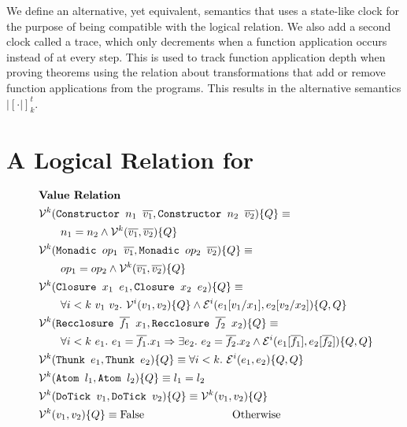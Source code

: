 We define an alternative, yet equivalent, semantics that uses a state-like clock
for the purpose of being compatible with the logical relation. We also add a
second clock called a trace, which only decrements when a function application
occurs instead of at every step. This is used to track function application
depth when proving theorems using the relation about transformations that add or
remove function applications from the programs. This results in the alternative
semantics $|[\cdot|]_k^t$.

\section{A Logical Relation for \ThunkLang{}}

\begin{figure}[p]
\begin{align*}
  &\textbf{Value Relation}\\
  &\mathcal{V}^k(\lit{Constructor $n_1$ $\overline{v_1}$}, \lit{Constructor $n_2$ $\overline{v_2}$})\{Q\} \equiv\\
  &\qquad n_1 = n_2 \land \mathcal{V}^k(\overline{v_1}, \overline{v_2})\{Q\}\\
  &\mathcal{V}^k(\lit{Monadic $op_1$ $\overline{v_1}$}, \lit{Monadic $op_2$ $\overline{v_2}$})\{Q\} \equiv\\
  &\qquad op_1 = op_2 \land \mathcal{V}^k(\overline{v_1}, \overline{v_2})\{Q\}\\
  &\mathcal{V}^k(\lit{Closure $x_1$ $e_1$}, \lit{Closure $x_2$ $e_2$})\{Q\} \equiv\\
  &\qquad \forall i < k\ v_1\ v_2.\ \mathcal{V}^i(v_1, v_2)\{Q\} \land \mathcal{E}^i(e_1[v_1/x_1], e_2[v_2/x_2])\{Q,Q\}\\
  &\mathcal{V}^k(\lit{Recclosure $\overline{f_1}$ $x_1$}, \lit{Recclosure $\overline{f_2}$ $x_2$})\{Q\} \equiv\\
  &\qquad \forall i < k\ e_1.\ e_1 = \overline{f_1}.x_1
  \Rightarrow \exists e_2.\ e_2 = \overline{f_2}.x_2
  \land \mathcal{E}^i(e_1[\overline{f_1}], e_2[\overline{f_2}])\{Q,Q\}\\
  &\mathcal{V}^k(\lit{Thunk $e_1$}, \lit{Thunk $e_2$})\{Q\} \equiv
  \forall i < k.\ \mathcal{E}^i(e_1, e_2)\{Q,Q\}\\
  &\mathcal{V}^k(\lit{Atom $l_1$}, \lit{Atom $l_2$})\{Q\} \equiv
  l_1 = l_2\\
  &\mathcal{V}^k(\lit{DoTick $v_1$}, \lit{DoTick $v_2$})\{Q\} \equiv
  \mathcal{V}^k(v_1, v_2)\{Q\}\\
  &\mathcal{V}^k(v_1, v_2)\{Q\} \equiv \text{False} \qquad\qquad\qquad\qquad \text{Otherwise}\\

\end{align*}
\end{figure}
